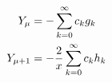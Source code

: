 \documentclass[12pt]{article}
\begin{document}
\begin{align}
Y_\mu &= -\sum_{k=0}^\infty c_k g_k \notag \\
Y_{\mu+1} &= -\frac{2}{x}\sum_{k=0}^\infty c_k h_k \notag
\end{align}
\end{document}
